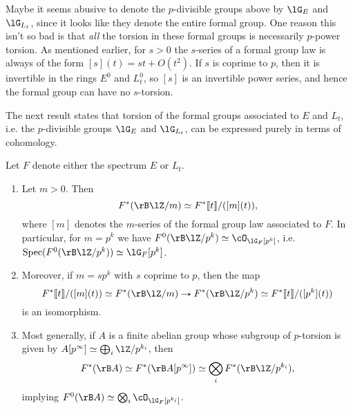 \begin{remark}
  \label{pdiv-noqtor}
  Maybe it seems abusive to denote the $p$-divisible groups above by
  $\lG_E$ and $\lG_{L_t}$, since it looks like they denote the entire
  formal group. One reason this isn't so bad is that \emph{all} the
  torsion in these formal groups is necessarily $p$-power torsion. As
  mentioned earlier, for $s > 0$ the $s$-series of a formal group law
  is always of the form $[s](t) = st + O(t^2)$. If $s$ is coprime to
  $p$, then it is invertible in the rings $E^0$ and $L_t^0$, so $[s]$
  is an invertible power series, and hence the formal group can have
  no $s$-torsion.
\end{remark}

The next result states that torsion of the formal groups associated to
$E$ and $L_t$, i.e. the $p$-divisible groups $\lG_E$ and $\lG_{L_t}$,
can be expressed purely in terms of cohomology.

\begin{proposition}
  Let $F$ denote either the spectrum $E$ or $L_t$.
  \label{pdiv-cohom}
  \begin{enumerate}
  \item \label{pdiv-cohom-m} Let $m > 0$. Then
    \[
    F^*(\rB\lZ/m) \iso F^* \ldb t \rdb / ([m](t)),
    \]
    where $[m]$ denotes the $m$-series of the formal group law
    associated to $F$. In particular, for $m = p^k$ we have
    $F^0(\rB\lZ/p^k) \iso \cO_{\lG_F[p^k]}$,
    i.e. $\Spec(F^0(\rB\lZ/p^k)) \iso \lG_F[p^k]$.
  \item \label{pdiv-cohom-pk} Moreover, if $m = sp^k$ with $s$ coprime
    to $p$, then the map
    \[
    F^* \ldb t \rdb / ([m](t)) \iso F^*(\rB\lZ/m) \to
    F^*(\rB\lZ/p^k) \iso F^* \ldb t \rdb / ([p^k](t))
    \]
    is an isomorphism.
  \item \label{pdiv-cohom-gen} Most generally, if $A$ is a finite
    abelian group whose subgroup of $p$-torsion is given by
    $A[p^\infty] \iso \bigoplus_i \lZ/p^{k_i}$, then
    \[
    F^*(\rB A) \iso F^*(\rB A[p^\infty]) \iso
    \bigotimes_i F^*(\rB\lZ/p^{k_i}),
    \]
    implying $F^0(\rB A) \iso \bigotimes_i \cO_{\lG_F[p^{k_i}]}$.
  \end{enumerate}
\end{proposition}

